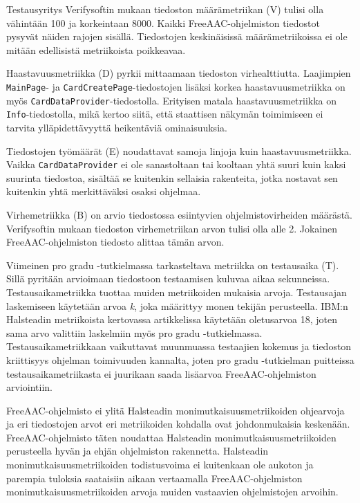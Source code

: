 \documentclass[utf8]{gradu3}
\begin{document}
Testausyritys Verifysoftin mukaan \parencite[]{halstead-verifysoft} tiedoston määrämetriikan (V) tulisi olla vähintään 100 ja korkeintaan 8000. Kaikki FreeAAC-ohjelmiston tiedostot pysyvät näiden rajojen sisällä. Tiedostojen keskinäisissä määrämetriikoissa ei ole mitään edellisistä metriikoista poikkeavaa.

Haastavuusmetriikka (D) pyrkii mittaamaan tiedoston virhealttiutta. Laajimpien \texttt{MainPage}- ja \texttt{CardCreatePage}-tiedostojen lisäksi korkea haastavuusmetriikka on myös \linebreak[4]\texttt{CardDataProvider}-tiedostolla. Erityisen matala haastavuusmetriikka on \texttt{Info}\nobreakdash-\hspace{0pt}tiedostolla, mikä kertoo siitä, että staattisen näkymän toimimiseen ei tarvita ylläpidettävyyttä heikentäviä ominaisuuksia.

Tiedostojen työmäärät (E) noudattavat samoja linjoja kuin haastavuusmetriikka. Vaikka \linebreak[4]\texttt{CardDataProvider} ei ole sanastoltaan tai kooltaan yhtä suuri kuin kaksi suurinta tiedostoa, sisältää se kuitenkin sellaisia rakenteita, jotka nostavat sen kuitenkin yhtä merkittäväksi osaksi ohjelmaa.

Virhemetriikka (B) on arvio tiedostossa esiintyvien ohjelmistovirheiden määrästä. Verifysoftin mukaan tiedoston virhemetriikan arvon tulisi olla alle 2. Jokainen FreeAAC-ohjelmiston tiedosto alittaa tämän arvon.

Viimeinen pro gradu -tutkielmassa tarkasteltava metriikka on testausaika (T). Sillä pyritään arvioimaan tiedostoon testaamisen kuluvaa aikaa sekunneissa. Testausaikametriikka tuottaa muiden metriikoiden mukaisia arvoja. Testausajan laskemiseen käytetään arvoa \textit{k}, joka määrittyy monen tekijän perusteella. IBM:n Halsteadin metriikoista kertovassa artikkelissa \parencite[]{halstead-ibm} käytetään oletusarvoa 18, joten sama arvo valittiin laskelmiin myös pro gradu -tutkielmassa. Testausaikametriikkaan vaikuttavat muunmuassa testaajien kokemus ja tiedoston kriittisyys ohjelman toimivuuden kannalta, joten pro gradu -tutkielman puitteissa testausaikametriikasta ei juurikaan saada lisäarvoa FreeAAC-ohjelmiston arviointiin.

FreeAAC-ohjelmisto ei ylitä Halsteadin monimutkaisuusmetriikoiden ohjearvoja ja eri tiedostojen arvot eri metriikoiden kohdalla ovat johdonmukaisia keskenään. FreeAAC\nobreakdash-\hspace{0pt}ohjelmisto täten noudattaa Halsteadin monimutkaisuusmetriikoiden perusteella hyvän ja ehjän ohjelmiston rakennetta. Halsteadin monimutkaisuusmetriikoiden todistusvoima ei kuitenkaan ole aukoton ja parempia tuloksia saataisiin aikaan vertaamalla FreeAAC-ohjelmiston monimutkaisuusmetriikoiden arvoja muiden vastaavien ohjelmistojen arvoihin. 
\end{document}
